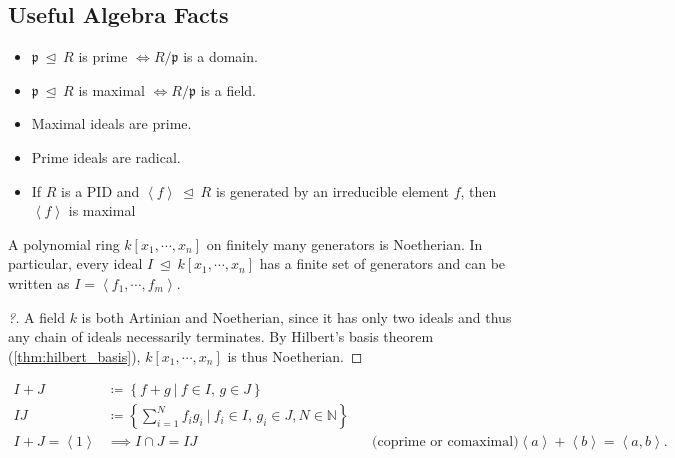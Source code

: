 \hypertarget{useful-algebra-facts}{%
\subsection{Useful Algebra Facts}\label{useful-algebra-facts}}

\begin{fact}

\envlist

\begin{itemize}
\tightlist
\item
  \(\mathfrak{p}{~\trianglelefteq~}R\) is prime \(\iff R/\mathfrak{p}\)
  is a domain.
\item
  \(\mathfrak{p}{~\trianglelefteq~}R\) is maximal
  \(\iff R/\mathfrak{p}\) is a field.
\item
  Maximal ideals are prime.
\item
  Prime ideals are radical.
\item
  If \(R\) is a PID and
  \(\left\langle{f}\right\rangle {~\trianglelefteq~}R\) is generated by
  an irreducible element \(f\), then \(\left\langle{f}\right\rangle\) is
  maximal
\end{itemize}

\end{fact}

\begin{proposition}

A polynomial ring \(k[x_1, \cdots, x_{n}]\) on finitely many generators
is Noetherian. In particular, every ideal
\(I{~\trianglelefteq~}k[x_1, \cdots, x_{n}]\) has a finite set of
generators and can be written as
\(I = \left\langle{f_1, \cdots, f_m}\right\rangle\).

\end{proposition}

\begin{proof}[?]

A field \(k\) is both Artinian and Noetherian, since it has only two
ideals and thus any chain of ideals necessarily terminates. By Hilbert's
basis theorem (\cref{thm:hilbert_basis}), \(k[x_1, \cdots, x_{n}]\) is
thus Noetherian.

\end{proof}

\begin{proposition}

\begin{align*}  
I+J   &\coloneqq\left\{{f+g {~\mathrel{\Big|}~}f\in I,\, g\in J}\right\} \\
IJ    &\coloneqq\left\{{\sum_{i=1}^N f_i g_i {~\mathrel{\Big|}~}f_i\in I,\, g_i\in J, N\in {\mathbb{N}}}\right\} \\
I+J   = \left\langle{1}\right\rangle 
      &\implies I\cap J = IJ && \text{(coprime or comaximal)}
\left\langle{a}\right\rangle + \left\langle{b}\right\rangle = \left\langle{a, b}\right\rangle
.\end{align*}

\end{proposition}

